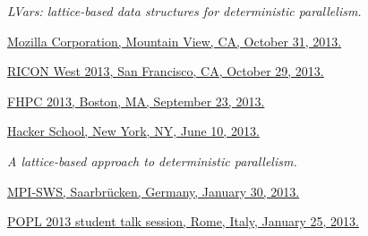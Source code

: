 \documentclass[10pt,letterpaper]{article}
\newenvironment{itemize*}
  {\begin{itemize}
      \setlength{\itemsep}{1pt}
      \setlength{\parskip}{3pt}
  }
  {\end{itemize}}
\begin{document}
\begin{itemize*}
\item
  \emph{LVars: lattice-based data structures for deterministic parallelism.}
  \begin{itemize*}
    \item
      \href{http://www.cs.indiana.edu/~lkuper/talks/monotonic-determinism/lvars-mozilla-2013.pdf}{Mozilla
        Corporation, Mountain View, CA, October 31, 2013.}
    \item
      \href{http://www.cs.indiana.edu/~lkuper/talks/monotonic-determinism/ricon-2013.pdf}{RICON
        West 2013, San Francisco, CA, October 29, 2013.}
    \item
      \href{http://www.cs.indiana.edu/~lkuper/talks/monotonic-determinism/fhpc-2013.pdf}{FHPC
        2013, Boston, MA, September 23, 2013.}
    \item
      \href{http://www.cs.indiana.edu/~lkuper/talks/monotonic-determinism/hacker-school-june-2013.pdf}{Hacker
        School, New York, NY, June 10, 2013.}
    \end{itemize*}


\item
  \emph{A lattice-based approach to deterministic parallelism.}
  \begin{itemize*}
    \item \href{http://www.cs.indiana.edu/~lkuper/talks/monotonic-determinism/mpi-sws-january-2013.pdf}{MPI-SWS,
      Saarbr\"{u}cken, Germany, January 30, 2013.}

    \item
      \href{http://www.cs.indiana.edu/~lkuper/talks/monotonic-determinism/popl-student-session-2013.pdf}{POPL
        2013 student talk session, Rome, Italy, January 25, 2013.}
  \end{itemize*}



\end{itemize*}
\end{document}
